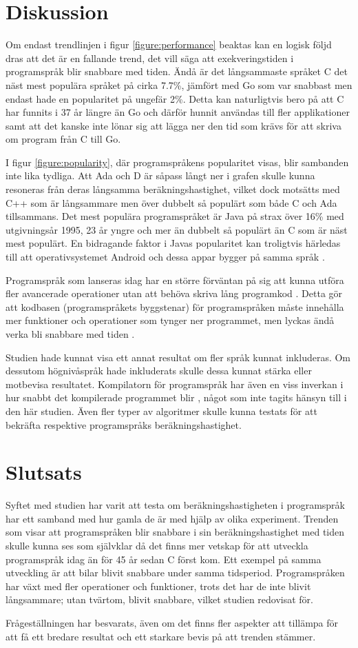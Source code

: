 \documentclass[12pt,swedish]{article}
\begin{document}
\section{Diskussion}
Om endast trendlinjen i figur \ref{figure:performance} beaktas kan en logisk följd dras att det är en fallande trend, det vill säga att exekveringstiden i programspråk blir snabbare med tiden. Ändå är det långsammaste språket C det näst mest populära språket på cirka 7.7\%, jämfört med Go som var snabbast men endast hade en popularitet på ungefär 2\%. Detta kan naturligtvis bero på att C har funnits i 37 år längre än Go och därför hunnit användas till fler applikationer samt att det kanske inte lönar sig att lägga ner den tid som krävs för att skriva om program från C till Go.

I figur \ref{figure:popularity}, där programspråkens popularitet visas, blir sambanden inte lika tydliga. Att Ada och D är såpass långt ner i grafen skulle kunna resoneras från deras långsamma beräkningshastighet, vilket dock motsätts med C++ som är långsammare men över dubbelt så populärt som både C och Ada tillsammans. Det mest populära programspråket är Java på strax över 16\% med utgivningsår 1995, 23 år yngre och mer än dubbelt så populärt än C som är näst mest populärt. En bidragande faktor i Javas popularitet kan troligtvis härledas till att operativsystemet Android och dessa appar bygger på samma språk \citep{gruman_2017}.

Programspråk som lanseras idag har en större förväntan på sig att kunna utföra fler avancerade operationer utan att behöva skriva lång programkod \citep{stroustrup_1997}. Detta gör att kodbasen (programspråkets byggstenar) för programspråken måste innehålla mer funktioner och operationer som tynger ner programmet, men lyckas ändå verka bli snabbare med tiden \citep{luong_2017}.

Studien hade kunnat visa ett annat resultat om fler språk kunnat inkluderas. Om dessutom högnivåspråk hade inkluderats skulle dessa kunnat stärka eller motbevisa resultatet. Kompilatorn för programspråk har även en viss inverkan i hur snabbt det kompilerade programmet blir \citep{srikant_shankar_2008}, något som inte tagits hänsyn till i den här studien. Även fler typer av algoritmer skulle kunna testats för att bekräfta respektive programspråks beräkningshastighet.


\section{Slutsats}
Syftet med studien har varit att testa om beräkningshastigheten i programspråk har ett samband med hur gamla de är med hjälp av olika experiment. Trenden som visar att programspråken blir snabbare i sin beräkningshastighet med tiden skulle kunna ses som självklar då det finns mer vetskap för att utveckla programspråk idag än för 45 år sedan C först kom. Ett exempel på samma utveckling är att bilar blivit snabbare under samma tidsperiod. Programspråken har växt med fler operationer och funktioner, trots det har de inte blivit långsammare; utan tvärtom, blivit snabbare, vilket studien redovisat för.

Frågeställningen har besvarats, även om det finns fler aspekter att tillämpa för att få ett bredare resultat och ett starkare bevis på att trenden stämmer.


\printbibliography

\end{document}
